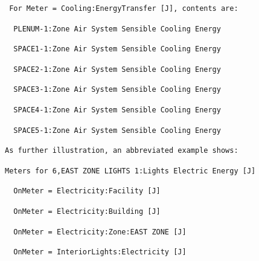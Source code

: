 \begin{lstlisting}
 For Meter = Cooling:EnergyTransfer [J], contents are:
\end{lstlisting}

\begin{lstlisting}
  PLENUM-1:Zone Air System Sensible Cooling Energy
\end{lstlisting}

\begin{lstlisting}
  SPACE1-1:Zone Air System Sensible Cooling Energy
\end{lstlisting}

\begin{lstlisting}
  SPACE2-1:Zone Air System Sensible Cooling Energy
\end{lstlisting}

\begin{lstlisting}
  SPACE3-1:Zone Air System Sensible Cooling Energy
\end{lstlisting}

\begin{lstlisting}
  SPACE4-1:Zone Air System Sensible Cooling Energy
\end{lstlisting}

\begin{lstlisting}
  SPACE5-1:Zone Air System Sensible Cooling Energy
\end{lstlisting}

\begin{lstlisting}
As further illustration, an abbreviated example shows:
\end{lstlisting}

\begin{lstlisting}
Meters for 6,EAST ZONE LIGHTS 1:Lights Electric Energy [J]
\end{lstlisting}

\begin{lstlisting}
  OnMeter = Electricity:Facility [J]
\end{lstlisting}

\begin{lstlisting}
  OnMeter = Electricity:Building [J]
\end{lstlisting}

\begin{lstlisting}
  OnMeter = Electricity:Zone:EAST ZONE [J]
\end{lstlisting}

\begin{lstlisting}
  OnMeter = InteriorLights:Electricity [J]
\end{lstlisting}

